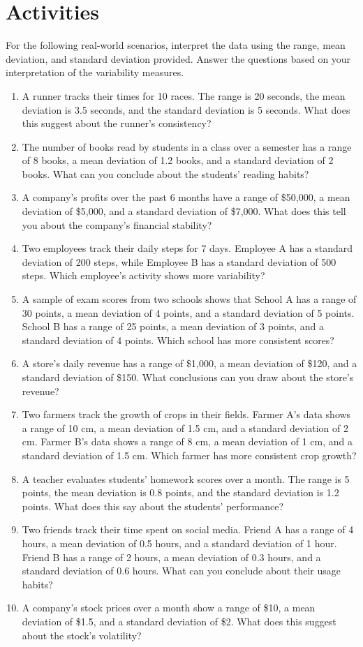 \section*{Activities}

For the following real-world scenarios, interpret the data using the range, mean deviation, and standard deviation provided. Answer the questions based on your interpretation of the variability measures.

\begin{enumerate}
    \item A runner tracks their times for 10 races. The range is 20 seconds, the mean deviation is 3.5 seconds, and the standard deviation is 5 seconds. What does this suggest about the runner’s consistency?
    \item The number of books read by students in a class over a semester has a range of 8 books, a mean deviation of 1.2 books, and a standard deviation of 2 books. What can you conclude about the students’ reading habits?
    \item A company’s profits over the past 6 months have a range of \$50,000, a mean deviation of \$5,000, and a standard deviation of \$7,000. What does this tell you about the company’s financial stability?
    \item Two employees track their daily steps for 7 days. Employee A has a standard deviation of 200 steps, while Employee B has a standard deviation of 500 steps. Which employee’s activity shows more variability?
    \item A sample of exam scores from two schools shows that School A has a range of 30 points, a mean deviation of 4 points, and a standard deviation of 5 points. School B has a range of 25 points, a mean deviation of 3 points, and a standard deviation of 4 points. Which school has more consistent scores?
    \item A store’s daily revenue has a range of \$1,000, a mean deviation of \$120, and a standard deviation of \$150. What conclusions can you draw about the store’s revenue?
    \item Two farmers track the growth of crops in their fields. Farmer A’s data shows a range of 10 cm, a mean deviation of 1.5 cm, and a standard deviation of 2 cm. Farmer B’s data shows a range of 8 cm, a mean deviation of 1 cm, and a standard deviation of 1.5 cm. Which farmer has more consistent crop growth?
    \item A teacher evaluates students' homework scores over a month. The range is 5 points, the mean deviation is 0.8 points, and the standard deviation is 1.2 points. What does this say about the students' performance?
    \item Two friends track their time spent on social media. Friend A has a range of 4 hours, a mean deviation of 0.5 hours, and a standard deviation of 1 hour. Friend B has a range of 2 hours, a mean deviation of 0.3 hours, and a standard deviation of 0.6 hours. What can you conclude about their usage habits?
    \item A company's stock prices over a month show a range of \$10, a mean deviation of \$1.5, and a standard deviation of \$2. What does this suggest about the stock’s volatility?
\end{enumerate}


